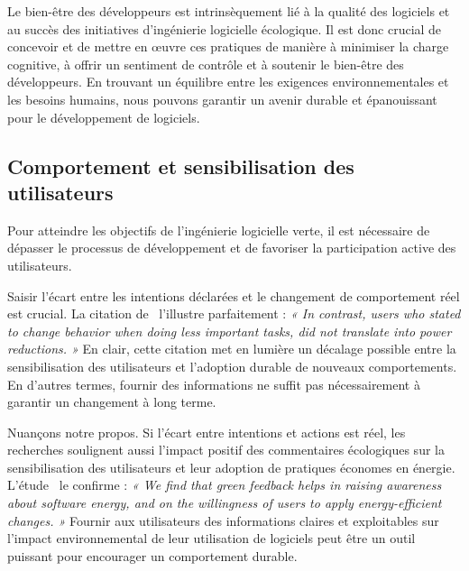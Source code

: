 Le bien-être des développeurs est intrinsèquement lié à la qualité des logiciels et au succès des initiatives d'ingénierie logicielle écologique. Il est donc crucial de concevoir et de mettre en œuvre ces pratiques de manière à minimiser la charge cognitive, à offrir un sentiment de contrôle et à soutenir le bien-être des développeurs. En trouvant un équilibre entre les exigences environnementales et les besoins humains, nous pouvons garantir un avenir durable et épanouissant pour le développement de logiciels.


\subsection{Comportement et sensibilisation des utilisateurs}

Pour atteindre les objectifs de l'ingénierie logicielle verte, il est nécessaire de dépasser le processus de développement et de favoriser la participation active des utilisateurs.


Saisir l'écart entre les intentions déclarées et le changement de comportement réel est crucial. La citation de~\cite{ImpactGreenFeedback} l'illustre parfaitement : \emph{« In contrast, users who stated to change behavior when doing less important tasks, did not translate into power reductions. »} En clair, cette citation met en lumière un décalage possible entre la sensibilisation des utilisateurs et l'adoption durable de nouveaux comportements. En d'autres termes, fournir des informations ne suffit pas nécessairement à garantir un changement à long terme.


Nuançons notre propos. Si l'écart entre intentions et actions est réel, les recherches soulignent aussi l'impact positif des commentaires écologiques sur la sensibilisation des utilisateurs et leur adoption de pratiques économes en énergie. L'étude~\cite{ImpactGreenFeedback} le confirme : \emph{« We find that green feedback helps in raising awareness about software energy, and on the willingness of users to apply energy-efficient changes. »} Fournir aux utilisateurs des informations claires et exploitables sur l'impact environnemental de leur utilisation de logiciels peut être un outil puissant pour encourager un comportement durable.


